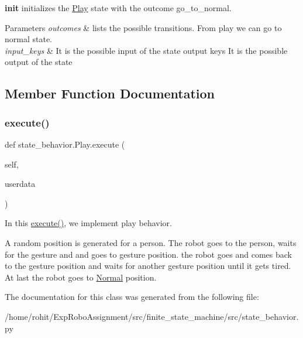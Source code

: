 {\bfseries init} initializes the \hyperlink{classstate__behavior_1_1Play}{Play} state with the outcome go\+\_\+to\+\_\+normal. 


\begin{DoxyParams}{Parameters}
{\em outcomes} & lists the possible transitions. From play we can go to normal state. \\
\hline
{\em input\+\_\+keys} & It is the possible input of the state  output keys It is the possible output of the state \\
\hline
\end{DoxyParams}


\subsection{Member Function Documentation}
\mbox{\label{classstate__behavior_1_1Play_a0b3baf44027bc1d5ec262ea8b67063b9}} 
\subsubsection{\texorpdfstring{execute()}{execute()}}
{\footnotesize\ttfamily def state\+\_\+behavior.\+Play.\+execute (\begin{DoxyParamCaption}\item[{}]{self,  }\item[{}]{userdata }\end{DoxyParamCaption})}



In this \hyperlink{classstate__behavior_1_1Play_a0b3baf44027bc1d5ec262ea8b67063b9}{execute()}, we implement play behavior. 

A random position is generated for a person. The robot goes to the person, waits for the gesture and and goes to gesture position. the robot goes and comes back to the gesture position and waits for another gesture position until it gets tired. At last the robot goes to \hyperlink{classstate__behavior_1_1Normal}{Normal} position. 

The documentation for this class was generated from the following file\+:\begin{DoxyCompactItemize}
\item 
/home/rohit/\+Exp\+Robo\+Assignment/src/finite\+\_\+state\+\_\+machine/src/state\+\_\+behavior.\+py\end{DoxyCompactItemize}
